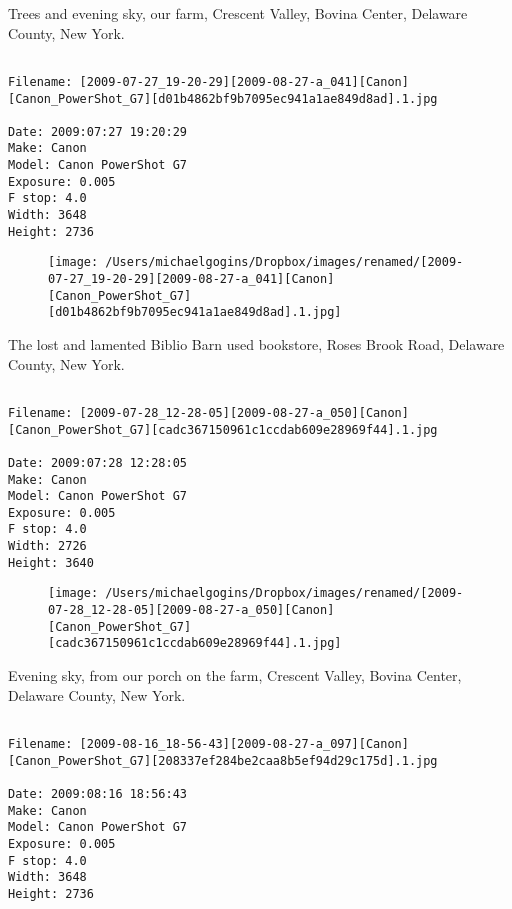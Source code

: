 \clearpage
\onecolumn
\noindent Trees and evening sky, our farm, Crescent Valley, Bovina Center, Delaware County, New York.
\noindent
\begin{lstlisting}

Filename: [2009-07-27_19-20-29][2009-08-27-a_041][Canon][Canon_PowerShot_G7][d01b4862bf9b7095ec941a1ae849d8ad].1.jpg

Date: 2009:07:27 19:20:29
Make: Canon
Model: Canon PowerShot G7
Exposure: 0.005
F stop: 4.0
Width: 3648
Height: 2736
\end{lstlisting}
\clearpage

\begin{figure}
\texttt{[image: /Users/michaelgogins/Dropbox/images/renamed/[2009-07-27\_19-20-29][2009-08-27-a\_041][Canon][Canon\_PowerShot\_G7][d01b4862bf9b7095ec941a1ae849d8ad].1.jpg]}
\end{figure}
    
\clearpage
\onecolumn
\noindent The lost and lamented Biblio Barn used bookstore, Roses Brook Road, Delaware County, New York.
\noindent
\begin{lstlisting}

Filename: [2009-07-28_12-28-05][2009-08-27-a_050][Canon][Canon_PowerShot_G7][cadc367150961c1ccdab609e28969f44].1.jpg

Date: 2009:07:28 12:28:05
Make: Canon
Model: Canon PowerShot G7
Exposure: 0.005
F stop: 4.0
Width: 2726
Height: 3640
\end{lstlisting}
\clearpage

\begin{figure}
\texttt{[image: /Users/michaelgogins/Dropbox/images/renamed/[2009-07-28\_12-28-05][2009-08-27-a\_050][Canon][Canon\_PowerShot\_G7][cadc367150961c1ccdab609e28969f44].1.jpg]}
\end{figure}
    
\clearpage
\onecolumn
\noindent Evening sky, from our porch on the farm, Crescent Valley, Bovina Center, Delaware County, New York.
\noindent
\begin{lstlisting}

Filename: [2009-08-16_18-56-43][2009-08-27-a_097][Canon][Canon_PowerShot_G7][208337ef284be2caa8b5ef94d29c175d].1.jpg

Date: 2009:08:16 18:56:43
Make: Canon
Model: Canon PowerShot G7
Exposure: 0.005
F stop: 4.0
Width: 3648
Height: 2736
\end{lstlisting}
\clearpage

